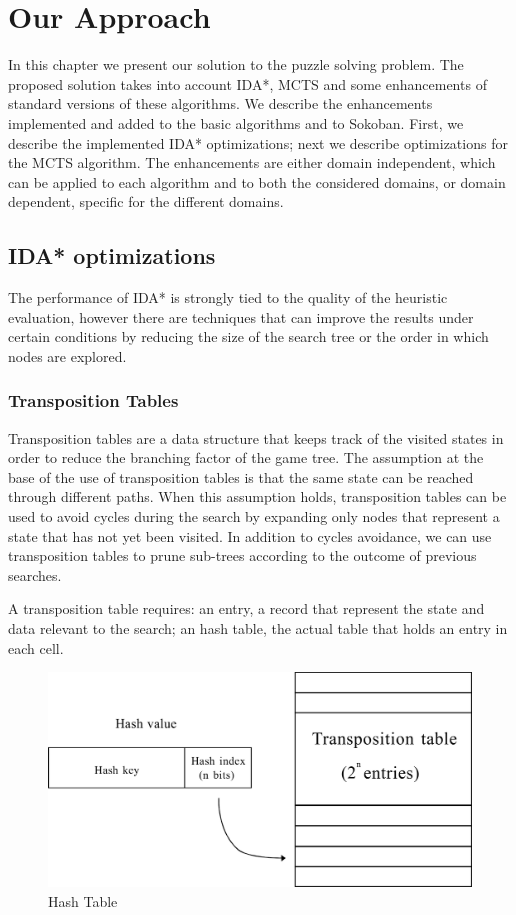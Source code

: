 \chapter{Our Approach}
\label{proposedsolution}
In this chapter we present our solution to the puzzle solving problem. The proposed solution takes into account IDA*, MCTS and some enhancements of standard versions of these algorithms. We describe the enhancements implemented and added to the basic algorithms and to Sokoban. First, we describe the implemented IDA* optimizations; next we describe optimizations for the MCTS algorithm. The enhancements are either domain independent, which can be applied to each algorithm and to both the considered domains, or domain dependent, specific for the different domains.

\section{IDA* optimizations}
The performance of IDA* is strongly tied to the quality of the heuristic evaluation, however there are techniques that can improve the results under certain conditions by reducing the size of the search tree or the order in which nodes are explored.

\subsection{Transposition Tables}
Transposition tables are a data structure that keeps track of the visited states in order to reduce the branching factor of the game tree. The assumption at the base of the use of transposition tables is that the same state can be reached through different paths. When this assumption holds, transposition tables can be used to avoid cycles during the search by expanding only nodes that represent a state that has not yet been visited. In addition to cycles avoidance, we can use transposition tables to prune sub-trees according to the outcome of previous searches.

\medskip\noindent
A transposition table requires: an entry, a record that represent the state and data relevant to the search; an hash table, the actual table that holds an entry in each cell.
\begin{figure}[ht]
\centering
\includegraphics[width=0.6\linewidth]{pictures/TranspositionTable.png}
\caption[Hash Table]{Hash Table \cite{transpositiontables}}
\label{fig:transpositiontable}
\end{figure}

